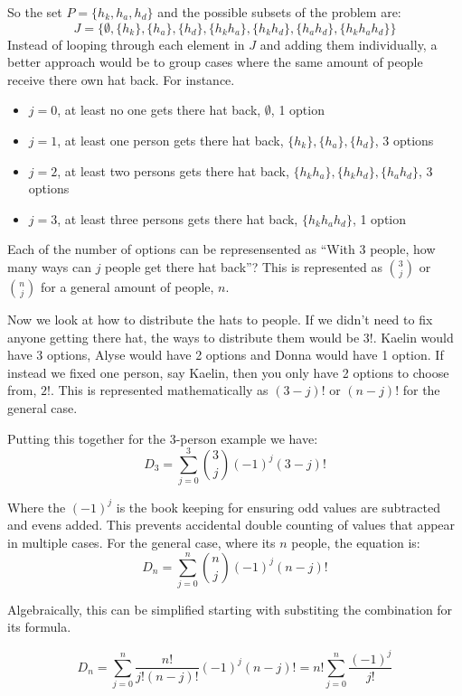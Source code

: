 \documentclass{article}
\begin{document}
So the set $P = \{h_k, h_a, h_d\}$ and the possible subsets of the problem are: $$J = \{\emptyset, \{h_k\}, \{h_a\}, \{h_d\}, \{h_k h_a\}, \{h_k h_d\}, \{h_a h_d\}, \{h_k h_a h_d\} \}$$ Instead of looping through each element in $J$ and adding them individually, a better approach would be to group cases where the same amount of people receive there own hat back. For instance.
\begin{itemize}
    \item $j = 0$, at least no one gets there hat back, $\emptyset$, 1 option 
    \item $j = 1$, at least one person gets there hat back, $\{h_k\}, \{h_a\}, \{h_d\}$, 3 options
    \item $j = 2$, at least two persons gets there hat back, $\{h_kh_a\}, \{h_kh_d\}, \{h_ah_d\}$, 3 options
    \item $j = 3$, at least three persons gets there hat back, $\{h_kh_ah_d\}$, 1 option
\end{itemize}
Each of the number of options can be represensented as ``With 3 people, how many ways can $j$ people get there hat back''? This is represented as $\binom{3}{j}$ or $\binom{n}{j}$ for a general amount of people, $n$. 

\medskip
Now we look at how to distribute the hats to people. If we didn't need to fix anyone getting there hat, the ways to distribute them would be $3!$. Kaelin would have 3 options, Alyse would have 2 options and Donna would have 1 option. If instead we fixed one person, say Kaelin, then you only have 2 options to choose from, $2!$. This is represented mathematically as $(3-j)!$ or $(n-j)!$ for the general case.

\medskip
Putting this together for the 3-person example we have:
\begin{equation*}
    D_3 = \sum_{j=0}^{3}\binom{3}{j}(-1)^{j}(3-j)!
\end{equation*}

Where the $(-1)^{j}$ is the book keeping for ensuring odd values are subtracted and evens added. This prevents accidental double counting of values that appear in multiple cases. For the general case, where its $n$ people, the equation is:
\begin{equation*}
    D_n = \sum_{j=0}^{n}\binom{n}{j}(-1)^{j}(n-j)!
\end{equation*}

Algebraically, this can be simplified starting with substiting the combination for its formula.

\begin{equation*}
    D_n = \sum_{j=0}^{n}\dfrac{n!}{j!(n-j)!}(-1)^{j}(n-j)! = n! \sum_{j=0}^{n}\dfrac{(-1)^{j}}{j!}
\end{equation*}
\end{document}
